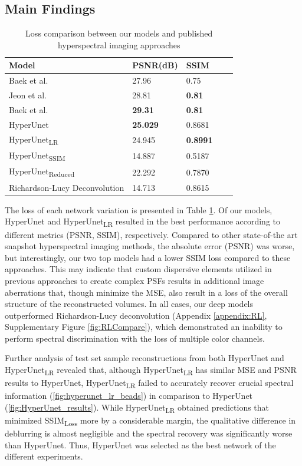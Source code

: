 \documentclass{article}
\begin{document}
\subsection{Main Findings}
\label{sec:main-findings}
\begin{table}
    \caption{Loss comparison between our models and published hyperspectral imaging approaches}
    \label{Results}
    \centering
    \begin{tabular}{lllll}
    \toprule
    Model & PSNR(dB) & SSIM \\
    \midrule
    Baek et al.\cite{baek2017compact} & 27.96 & 0.75 \\
    Jeon et al.\cite{jeon2019compact} & 28.81 & \textbf{0.81} \\
    Baek et al.\cite{baek2021single} & \textbf{29.31} & \textbf{0.81} \\
    \midrule
    HyperUnet & \textbf{25.029} & 0.8681 \\
    HyperUnet\textsubscript{LR} & 24.945 & \textbf{0.8991} \\
    HyperUnet\textsubscript{SSIM} & 14.887 & 0.5187 \\
    HyperUnet\textsubscript{Reduced} & 22.292 & 0.7870 \\
    Richardson-Lucy Deconvolution & 14.713 & 0.8615 \\
    \bottomrule
    \end{tabular}
\end{table}

The loss of each network variation is presented in Table \ref{Results}. Of our models, HyperUnet and HyperUnet\textsubscript{LR} resulted in the best performance according to different metrics (PSNR, SSIM), respectively. Compared to other state-of-the art snapshot hyperspectral imaging methods, the absolute error (PSNR) was worse, but interestingly, our two top models had a lower SSIM loss compared to these approaches. This may indicate that custom dispersive elements utilized in previous approaches to create complex PSFs results in additional image aberrations that, though minimize the MSE, also result in a loss of the overall structure of the reconstructed volumes. In all cases, our deep models outperformed Richardson-Lucy deconvolution (Appendix \ref{appendix:RL}, Supplementary Figure \ref{fig:RLCompare}), which demonstrated an inability to perform spectral discrimination with the loss of multiple color channels.

Further analysis of test set sample reconstructions from both HyperUnet and HyperUnet\textsubscript{LR} revealed that, although HyperUnet\textsubscript{LR} has similar MSE and PSNR results to HyperUnet, HyperUnet\textsubscript{LR} failed to accurately recover crucial spectral information (\ref{fig:hyperunet_lr_beads}) in comparison to HyperUnet (\ref{fig:HyperUnet_results}). While HyperUnet\textsubscript{LR} obtained predictions that minimized SSIM\textsubscript{Loss} more by a considerable margin, the qualitative difference in deblurring is almost negligible and the spectral recovery was significantly worse than HyperUnet. Thus, HyperUnet was selected as the best network of the different experiments.
\end{document}
